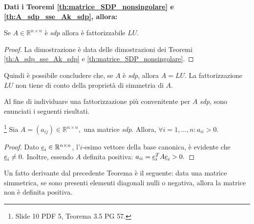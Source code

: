 \textbf{Dati i Teoremi \ref{th:matrice_SDP_nonsingolare} e \ref{th:A_sdp_sse_Ak_sdp}, allora:}
\begin{corollary}
	Se $A\in\mathbb{R}^{n\times n}$ è \textit{sdp} allora è fattorizzabile $LU$. 
\end{corollary}
\begin{proof}
	La dimostrazione è data delle dimostrazioni dei Teoremi \ref{th:A_sdp_sse_Ak_sdp} e \ref{th:matrice_SDP_nonsingolare}.
\end{proof}

Quindi è possibile concludere che, se $A$ è \textit{sdp}, allora $A=LU$. La fattorizzazione $LU$ non tiene di conto della proprietà di simmetria di $A$.

Al fine di individuare una fattorizzazione più convenitente per $A$ \textit{sdp}, sono enunciati i seguenti risultati.

\begin{theorem}\label{th:matrice_sdp_diagonale_positiva}\footnote{Slide 10 PDF 5, Teorema 3.5 PG 57.}
    Sia $A=(a_{ij})\in\mathbb R^{n\times n},$ una matrice \textit{sdp}. Allora, $\forall i=1,\hdots,n: a_{ii}>0.$
\end{theorem}
\begin{proof}
    Dato $\uline e_i\in\mathbb R^{n\times n}$, l'$i$-esimo vettore della base canonica, è evidente che $\uline e_i\neq 0.$ Inoltre, essendo $A$ definita positiva: $a_{ii}=\uline e_i^T A \uline e_i>0.$
\end{proof}

Un fatto derivante dal precedente Teorema è il seguente: data una matrice simmetrica, se sono presenti elementi diagonali nulli o negativa, allora la matrice non è definita positiva. 

